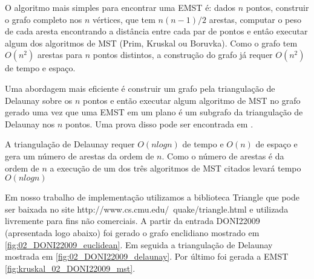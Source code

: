 \documentclass[12pt,a4paper]{article}
\begin{document}



O algoritmo mais simples para encontrar uma EMST é: dados $n$ pontos, construir
o grafo completo nos $n$ vértices, que tem $n(n-1)/2$ arestas, computar o peso
de cada aresta encontrando a distância entre cada par de pontos e entâo executar
algum dos algoritmos de MST (Prim, Kruskal ou Boruvka). Como o grafo tem
$O(n^2)$ arestas para $n$ pontos distintos, a construção do grafo já requer
$O(n^2)$ de tempo e espaço.


Uma abordagem mais eficiente é construir um grafo pela triangulação de Delaunay
sobre os $n$ pontos e então executar algum algoritmo de MST no grafo gerado uma
vez que uma EMST em um plano é um subgrafo da triangulação de Delaunay nos $n$
pontos. Uma prova disso pode ser encontrada em \cite{subramani-computational}.

A triangulação de Delaunay requer $O(n log n)$ de tempo e $O(n)$ de espaço e
gera um número de arestas da ordem de $n$. Como o número de arestas é da ordem
de $n$ a execução de um dos três algoritmos de MST citados levará tempo $O(n log
n)$

Em nosso trabalho de implementação utilizamos a biblioteca Triangle que pode ser
baixada no site http://www.cs.cmu.edu/~quake/triangle.html e utilizada
livremente para fins não comerciais. %
A partir da entrada DONI22009 (apresentada logo abaixo) foi gerado o grafo
enclidiano mostrado em \ref{fig:02_DONI22009_euclidean}. Em seguida a
triangulação de Delaunay mostrada em \ref{fig:02_DONI22009_delaunay}. Por último
foi gerada a EMST \ref{fig:kruskal_02_DONI22009_mst}.
\end{document}
